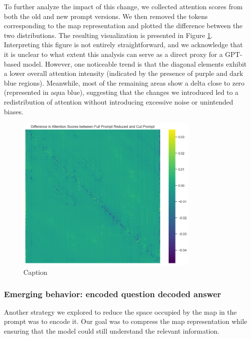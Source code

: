 To further analyze the impact of this change, we collected attention scores from
both the old and new prompt versions. We then removed the tokens corresponding to
the map representation and plotted the difference between the two distributions.
The resulting visualization is presented in Figure \ref{fig:difference}. Interpreting
this figure is not entirely straightforward, and we acknowledge that it is
unclear to what extent this analysis can serve as a direct proxy for a GPT-based
model. However, one noticeable trend is that the diagonal elements exhibit a
lower overall attention intensity (indicated by the presence of purple and dark blue
regions). Meanwhile, most of the remaining areas show a delta close to zero (represented
in aqua blue), suggesting that the changes we introduced led to a redistribution
of attention without introducing excessive noise or unintended biases.

\begin{figure}[h!]
  \centering
  \includegraphics[width=0.8\textwidth]{images/difference.png}
  \caption{Caption}
  \label{fig:difference}
\end{figure}

\subsubsection{Emerging behavior: encoded question decoded answer}

Another strategy we explored to reduce the space occupied by the map in the prompt
was to encode it. Our goal was to compress the map representation while ensuring
that the model could still understand the relevant information.

